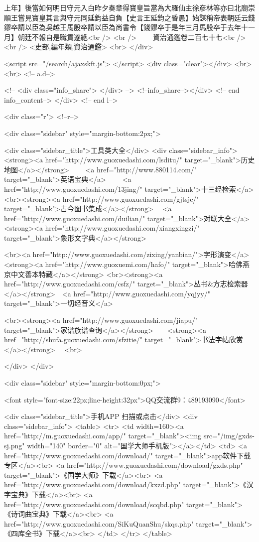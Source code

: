 上年】後當如何明日守元入白昨夕奏章得寶皇旨當為大羅仙主徐彦林等亦曰北廟崇順王嘗見寶皇其言與守元同延鈞益自負【史言王延鈞之昏愚】始謀稱帝表朝廷云錢鏐卒請以臣為吳越王馬殷卒請以臣為尚書令【錢鏐卒于是年三月馬殷卒于去年十一月】朝廷不報自是職貢遂絶<br />
<br />
　　資治通鑑卷二百七十七<br />
<br />
<史部,編年類,資治通鑑>  <br>
   </div> 

<script src="/search/ajaxskft.js"> </script>
 <div class="clear"></div>
<br>
<br>
 <!-- a.d-->

 <!--
<div class="info_share">
</div> 
-->
 <!--info_share--></div>   <!-- end info_content-->
  </div> <!-- end l-->

<div class="r">   <!--r-->



<div class="sidebar"  style="margin-bottom:2px;">

 
<div class="sidebar_title">工具类大全</div>
<div class="sidebar_info">
<strong><a href="http://www.guoxuedashi.com/lsditu/" target="_blank">历史地图</a></strong>　　
<a href="http://www.880114.com/" target="_blank">英语宝典</a>　　
<a href="http://www.guoxuedashi.com/13jing/" target="_blank">十三经检索</a>　
<br><strong><a href="http://www.guoxuedashi.com/gjtsjc/" target="_blank">古今图书集成</a></strong>　
<a href="http://www.guoxuedashi.com/duilian/" target="_blank">对联大全</a>　<strong><a href="http://www.guoxuedashi.com/xiangxingzi/" target="_blank">象形文字典</a></strong>　

<br><a href="http://www.guoxuedashi.com/zixing/yanbian/">字形演变</a>　　<strong><a href="http://www.guoxuemi.com/hafo/" target="_blank">哈佛燕京中文善本特藏</a></strong>
<br><strong><a href="http://www.guoxuedashi.com/csfz/" target="_blank">丛书&方志检索器</a></strong>　<a href="http://www.guoxuedashi.com/yqjyy/" target="_blank">一切经音义</a>　　

<br><strong><a href="http://www.guoxuedashi.com/jiapu/" target="_blank">家谱族谱查询</a></strong>　　<strong><a href="http://shufa.guoxuedashi.com/sfzitie/" target="_blank">书法字帖欣赏</a></strong>　
<br>

</div>
</div>


<div class="sidebar" style="margin-bottom:0px;">

<font style="font-size:22px;line-height:32px">QQ交流群9：489193090</font>


<div class="sidebar_title">手机APP 扫描或点击</div>
<div class="sidebar_info">
<table>
<tr>
	<td width=160><a href="http://m.guoxuedashi.com/app/" target="_blank"><img src="/img/gxds-sj.png" width="140"  border="0" alt="国学大师手机版"></a></td>
	<td>
<a href="http://www.guoxuedashi.com/download/" target="_blank">app软件下载专区</a><br>
<a href="http://www.guoxuedashi.com/download/gxds.php" target="_blank">《国学大师》下载</a><br>
<a href="http://www.guoxuedashi.com/download/kxzd.php" target="_blank">《汉字宝典》下载</a><br>
<a href="http://www.guoxuedashi.com/download/scqbd.php" target="_blank">《诗词曲宝典》下载</a><br>
<a href="http://www.guoxuedashi.com/SiKuQuanShu/skqs.php" target="_blank">《四库全书》下载</a><br>
</td>
</tr>
</table>

